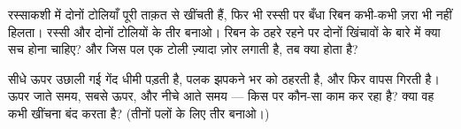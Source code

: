 \begin{exercise}[$\star\star$]\label{exo:g2:pushes-and-pulls:9}
रस्साकशी में दोनों टोलियाँ पूरी ताक़त से खींचती हैं, फिर भी रस्सी पर
बँधा रिबन कभी-कभी ज़रा भी नहीं हिलता। रस्सी और दोनों टोलियों के तीर
बनाओ। रिबन के ठहरे रहने पर दोनों खिंचावों के बारे में क्या सच होना
चाहिए? और जिस पल एक टोली ज़्यादा ज़ोर लगाती है, तब क्या होता है?
\end{exercise}

\begin{exercise}[$\star\star$]\label{exo:g2:pushes-and-pulls:10}
सीधे ऊपर उछाली गई गेंद धीमी पड़ती है, पलक झपकने भर को ठहरती है, और
फिर वापस गिरती है। ऊपर जाते समय, सबसे ऊपर, और नीचे आते समय --- किस
पर कौन-सा  काम कर रहा है? क्या वह कभी खींचना बंद करता है? (तीनों
पलों के लिए तीर बनाओ।)
\end{exercise}
